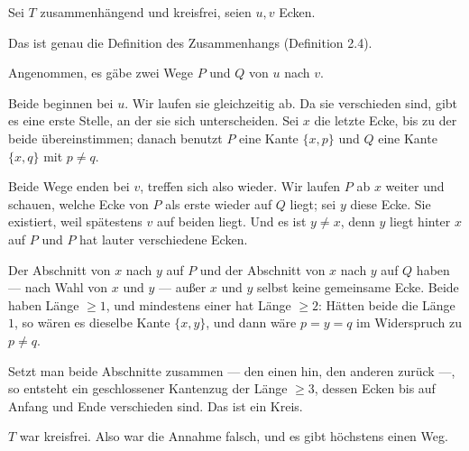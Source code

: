 \begin{merksatz}
Sei $T$ zusammenhängend und kreisfrei, seien $u,v$ Ecken.

Das ist genau die Definition des Zusammenhangs (Definition 2.4).

Angenommen, es gäbe zwei  Wege $P$ und $Q$ von $u$ nach $v$.

Beide beginnen bei $u$. Wir laufen sie gleichzeitig ab. Da sie verschieden sind, gibt es eine erste Stelle, an der sie sich unterscheiden. Sei $x$ die letzte Ecke, bis zu der beide übereinstimmen; danach benutzt $P$ eine Kante $\{x, p\}$ und $Q$ eine Kante $\{x, q\}$ mit $p \neq q$.

Beide Wege enden bei $v$, treffen sich also wieder. Wir laufen $P$ ab $x$ weiter und schauen, welche Ecke von $P$ als erste wieder auf $Q$ liegt; sei $y$ diese Ecke. Sie existiert, weil spätestens $v$ auf beiden liegt. Und es ist $y \neq x$, denn $y$ liegt hinter $x$ auf $P$ und $P$ hat lauter verschiedene Ecken.

\begin{center}
\end{center}

Der Abschnitt von $x$ nach $y$ auf $P$ und der Abschnitt von $x$ nach $y$ auf $Q$ haben --- nach Wahl von $x$ und $y$ --- außer $x$ und $y$ selbst keine gemeinsame Ecke. Beide haben Länge $\ge 1$, und mindestens einer hat Länge $\ge 2$: Hätten beide die Länge $1$, so wären es dieselbe Kante $\{x,y\}$, und dann wäre $p = y = q$ im Widerspruch zu $p \neq q$.

Setzt man beide Abschnitte zusammen --- den einen hin, den anderen zurück ---, so entsteht ein geschlossener Kantenzug der Länge $\ge 3$, dessen Ecken bis auf Anfang und Ende verschieden sind. Das ist ein Kreis.

$T$ war kreisfrei. Also war die Annahme falsch, und es gibt höchstens einen Weg.
\end{merksatz}

